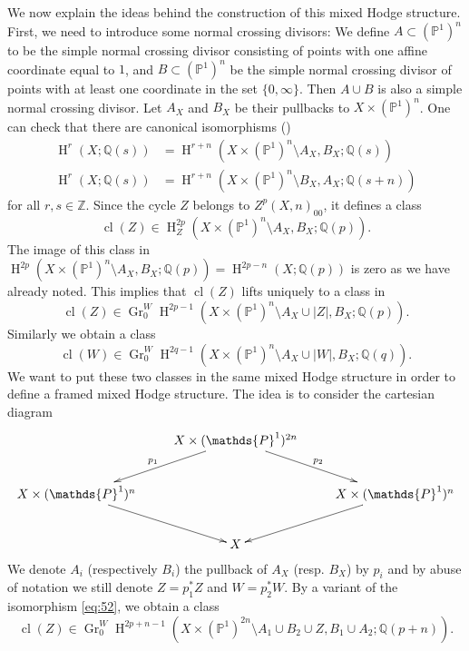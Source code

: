 \documentclass[11pt,a4paper]{amsart}
\renewcommand{\P}{\mathds{P}}
\newcommand{\Q}{\mathds{Q}}
\newcommand{\Z}{\mathds{Z}}
\DeclareMathOperator {\Gr} {Gr}
\DeclareMathOperator {\cl}{cl}
\DeclareMathOperator{\rH}{H}
\numberwithin{equation}{section}
\theoremstyle{plain}
\theoremstyle{definition}
\begin{document}
We now explain the ideas behind the construction of  this mixed Hodge
structure. First, we need to introduce some normal 
crossing divisors: We define $A\subset (\P^1)^{n}$ to be the simple
normal crossing divisor consisting of points with one affine
coordinate equal to $1$, and $B\subset (\P^1)^{n}$ be the simple
normal crossing divisor of points with at least one coordinate in the
set $\{0,\infty\}$. Then $A\cup B$ is also a simple normal crossing
divisor. Let $A_{X}$ and $B_{X}$ be their pullbacks to
$X\times (\P^1)^{n}$. One can check that there are canonical
isomorphisms (\cite[eqs. (3.4) and (3.5)]{BGGP:Height})
\begin{align}
  \rH^{r}(X;\Q(s))&=\rH^{r+n}(X\times (\P^1)^n\setminus A_X,B_X;\Q(s))\label{eq:51}\\
  \rH^{r}(X;\Q(s))&=\rH^{r+n}(X\times (\P^1)^n\setminus B_X,A_X;\Q(s+n))\label{eq:52}
\end{align}
for all $r,s\in \Z$.
Since the cycle $Z$ belongs to $Z^p(X,n)_{00}$, it defines a class
\begin{displaymath}
  \cl(Z)\in \rH^{2p}_{Z}(X\times (\P^1)^n\setminus A_X,B_X;\Q(p)).  
\end{displaymath}
The image of this class in
$\rH^{2p}(X\times (\P^1)^n\setminus A_X,B_X;\Q(p))=\rH^{2p-n}(X;\Q(p))$
is zero as we have already noted. This implies that $\cl(Z)$ lifts
uniquely to a class in 
\begin{displaymath}
\cl(Z)\in \Gr^{W}_{0}\rH^{2p-1}(X\times (\P^1)^{n}\setminus A_{X}\cup |Z|, B_{X}; \Q(p)).
\end{displaymath}
Similarly we obtain a class 
\begin{displaymath}
\cl(W)\in \Gr^{W}_{0}\rH^{2q-1}(X\times (\P^1)^{n}\setminus A_{X}\cup
|W|, B_{X}; \Q(q)).
\end{displaymath}
We want to put these two classes in the same mixed Hodge structure in
order to define a framed mixed Hodge structure. The idea is to consider the cartesian diagram  
\begin{displaymath}
  \xymatrix{&X\times (\P^{1})^{2n}\ar[dl]_{p_{1}} \ar[dr]^{p_{2}}&\\
    X\times (\P^{1})^{n} \ar[dr]&& X\times (\P^{1})^{n}\ar[dl]\\
    &X&
  }
\end{displaymath}
We denote $A_i$ (respectively $B_i$) the pullback of $A_X$
(resp. $B_X$) by $p_i$ and by abuse of notation we still denote
$Z=p_1^\ast Z$  and $W=p_2^\ast W$.  By a variant of the isomorphism
\eqref{eq:52}, we obtain a class
\begin{displaymath}
  \cl(Z)\in \Gr^{W}_0\rH^{2p+n-1}(X\times (\P^1)^{2n}\setminus A_1\cup B_2\cup
  Z,B_1\cup A_2;\Q(p+n)).
\end{displaymath}
\end{document}

